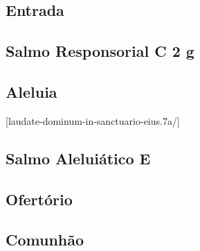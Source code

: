 
\subsection{Entrada}\label{subsection:tempus-per-annum/sanctissimae-trinitatis/introitus}

\subsection[Salmo Responsorial]{Salmo Responsorial \textmd{C 2 g}}\label{subsection:tempus-per-annum/sanctissimae-trinitatis/psalmus-responsorius}

\AllowPageFlush

\subsection{Aleluia}\label{subsection:tempus-per-annum/sanctissimae-trinitatis/alleluia}
[laudate-dominum-in-sanctuario-eius.7a/]

\subsection[Salmo Aleluiático]{Salmo Aleluiático \textmd{E \protect\GreStar}}\label{subsection:tempus-per-annum/sanctissimae-trinitatis/psalmus-alleluiaticus}

\subsection{Ofertório}\label{subsection:tempus-per-annum/sanctissimae-trinitatis/offertorium}

\AllowPageFlush

\subsection{Comunhão}\label{subsection:tempus-per-annum/sanctissimae-trinitatis/communio}
